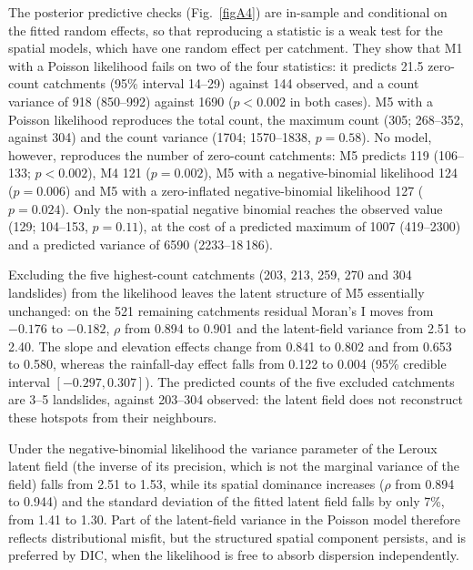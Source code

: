 \documentclass[journal abbreviation, manuscript]{copernicus}
\begin{document}
The posterior predictive checks (Fig.~\ref{figA4}) are in-sample and conditional on the fitted random effects, so that reproducing a statistic is a weak test for the spatial models, which have one random effect per catchment. They show that M1 with a Poisson likelihood fails on two of the four statistics: it predicts 21.5 zero-count catchments (95\% interval 14--29) against 144 observed, and a count variance of 918 (850--992) against 1690 ($p < 0.002$ in both cases). M5 with a Poisson likelihood reproduces the total count, the maximum count (305; 268--352, against 304) and the count variance (1704; 1570--1838, $p = 0.58$). No model, however, reproduces the number of zero-count catchments: M5 predicts 119 (106--133; $p < 0.002$), M4 121 ($p = 0.002$), M5 with a negative-binomial likelihood 124 ($p = 0.006$) and M5 with a zero-inflated negative-binomial likelihood 127 ($p = 0.024$). Only the non-spatial negative binomial reaches the observed value (129; 104--153, $p = 0.11$), at the cost of a predicted maximum of 1007 (419--2300) and a predicted variance of 6590 (2233--18\,186).

Excluding the five highest-count catchments (203, 213, 259, 270 and 304 landslides) from the likelihood leaves the latent structure of M5 essentially unchanged: on the 521 remaining catchments residual Moran's I moves from $-0.176$ to $-0.182$, $\rho$ from 0.894 to 0.901 and the latent-field variance from 2.51 to 2.40. The slope and elevation effects change from 0.841 to 0.802 and from 0.653 to 0.580, whereas the rainfall-day effect falls from 0.122 to 0.004 (95\% credible interval $[-0.297, 0.307]$). The predicted counts of the five excluded catchments are 3--5 landslides, against 203--304 observed: the latent field does not reconstruct these hotspots from their neighbours.

Under the negative-binomial likelihood the variance parameter of the Leroux latent field (the inverse of its precision, which is not the marginal variance of the field) falls from 2.51 to 1.53, while its spatial dominance increases ($\rho$ from 0.894 to 0.944) and the standard deviation of the fitted latent field falls by only 7\%, from 1.41 to 1.30. Part of the latent-field variance in the Poisson model therefore reflects distributional misfit, but the structured spatial component persists, and is preferred by DIC, when the likelihood is free to absorb dispersion independently.
\end{document}
